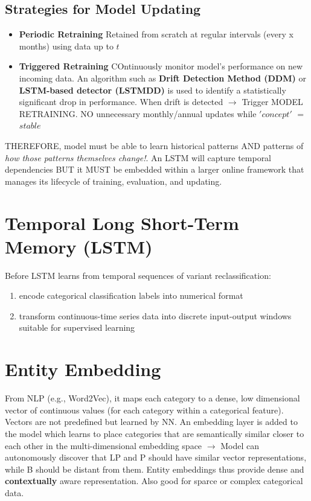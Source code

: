 \documentclass[../main.tex]{subfiles}
\begin{document}
\subsection{Strategies for Model Updating}
\begin{itemize}
    \item \textbf{Periodic Retraining} Retained from scratch at regular intervals (every x months) using data up to $t$
    \item \textbf{Triggered Retraining} COntinuously monitor model's performance on new incoming data. An algorithm such as \textbf{Drift Detection Method (DDM)} or \textbf{LSTM-based detector (LSTMDD)} is used to identify a statistically significant drop in performance. When drift is detected $\rightarrow$ Trigger MODEL RETRAINING. NO unnecessary monthly/annual updates while $'concept'$ $=$ $stable$
    \end{itemize}

    THEREFORE, model must be able to learn historical patterns AND patterns of \textit{how those patterns themselves change!}. An LSTM will capture temporal dependencies BUT it MUST be embedded within a larger online framework that manages its lifecycle of training, evaluation, and updating.

\section{Temporal Long Short-Term Memory (LSTM)}

Before LSTM learns from temporal sequences of variant reclassification:  
\begin{enumerate}
    \item encode categorical classification labels into numerical format
    \item transform continuous-time series data into discrete input-output windows suitable for supervised learning
\end{enumerate}

\section{Entity Embedding}

    From NLP (e.g., Word2Vec), it maps each category to a dense, low dimensional vector of continuous values (for each category within a categorical feature). Vectors are not predefined but learned by NN. An embedding layer is added to the model which learns to place categories that are semantically similar closer to each other in the multi-dimensional embedding space $\rightarrow$ Model can autonomously discover that LP and P should have similar vector representations, while B should be distant from them. Entity embeddings thus provide dense and \textbf{contextually} aware representation. Also good for sparce or complex categorical data. 
\end{document}
